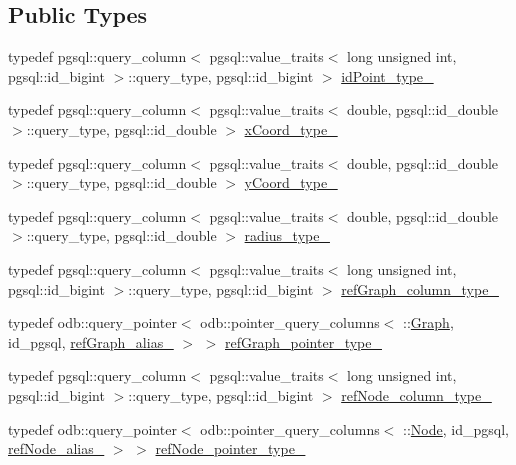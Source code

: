 \subsection*{Public Types}
\begin{DoxyCompactItemize}
\item 
typedef pgsql\+::query\+\_\+column$<$ pgsql\+::value\+\_\+traits$<$ long unsigned int, pgsql\+::id\+\_\+bigint $>$\+::query\+\_\+type, pgsql\+::id\+\_\+bigint $>$ \hyperlink{structodb_1_1query__columns_3_01_1_1_point_00_01id__pgsql_00_01_a_01_4_a1b73c11154d6a12b3bda33b0362e1cbd}{id\+Point\+\_\+type\+\_\+}
\item 
typedef pgsql\+::query\+\_\+column$<$ pgsql\+::value\+\_\+traits$<$ double, pgsql\+::id\+\_\+double $>$\+::query\+\_\+type, pgsql\+::id\+\_\+double $>$ \hyperlink{structodb_1_1query__columns_3_01_1_1_point_00_01id__pgsql_00_01_a_01_4_a2410ebc7698f7395087c9cf262e74e67}{x\+Coord\+\_\+type\+\_\+}
\item 
typedef pgsql\+::query\+\_\+column$<$ pgsql\+::value\+\_\+traits$<$ double, pgsql\+::id\+\_\+double $>$\+::query\+\_\+type, pgsql\+::id\+\_\+double $>$ \hyperlink{structodb_1_1query__columns_3_01_1_1_point_00_01id__pgsql_00_01_a_01_4_a63554286768ef21f26b9034334df7a25}{y\+Coord\+\_\+type\+\_\+}
\item 
typedef pgsql\+::query\+\_\+column$<$ pgsql\+::value\+\_\+traits$<$ double, pgsql\+::id\+\_\+double $>$\+::query\+\_\+type, pgsql\+::id\+\_\+double $>$ \hyperlink{structodb_1_1query__columns_3_01_1_1_point_00_01id__pgsql_00_01_a_01_4_a920c99ed9235ee77ecae8f3de56c88b5}{radius\+\_\+type\+\_\+}
\item 
typedef pgsql\+::query\+\_\+column$<$ pgsql\+::value\+\_\+traits$<$ long unsigned int, pgsql\+::id\+\_\+bigint $>$\+::query\+\_\+type, pgsql\+::id\+\_\+bigint $>$ \hyperlink{structodb_1_1query__columns_3_01_1_1_point_00_01id__pgsql_00_01_a_01_4_a7990da27718c07e8f22372ebf2141b5c}{ref\+Graph\+\_\+column\+\_\+type\+\_\+}
\item 
typedef odb\+::query\+\_\+pointer$<$ odb\+::pointer\+\_\+query\+\_\+columns$<$ \+::\hyperlink{class_graph}{Graph}, id\+\_\+pgsql, \hyperlink{structodb_1_1query__columns__base_3_01_1_1_point_00_01id__pgsql_01_4_a19b02b8f057af3570dba889095b17ccd}{ref\+Graph\+\_\+alias\+\_\+} $>$ $>$ \hyperlink{structodb_1_1query__columns_3_01_1_1_point_00_01id__pgsql_00_01_a_01_4_a46cf54b02d697a2818e886261a4835a7}{ref\+Graph\+\_\+pointer\+\_\+type\+\_\+}
\item 
typedef pgsql\+::query\+\_\+column$<$ pgsql\+::value\+\_\+traits$<$ long unsigned int, pgsql\+::id\+\_\+bigint $>$\+::query\+\_\+type, pgsql\+::id\+\_\+bigint $>$ \hyperlink{structodb_1_1query__columns_3_01_1_1_point_00_01id__pgsql_00_01_a_01_4_a6129668a657849ef92aad6ed6735262c}{ref\+Node\+\_\+column\+\_\+type\+\_\+}
\item 
typedef odb\+::query\+\_\+pointer$<$ odb\+::pointer\+\_\+query\+\_\+columns$<$ \+::\hyperlink{class_node}{Node}, id\+\_\+pgsql, \hyperlink{structodb_1_1query__columns__base_3_01_1_1_point_00_01id__pgsql_01_4_aa47a7e27f3d9c6033aaa352be5a32b02}{ref\+Node\+\_\+alias\+\_\+} $>$ $>$ \hyperlink{structodb_1_1query__columns_3_01_1_1_point_00_01id__pgsql_00_01_a_01_4_a4a11b6d519a7123063c4544cb53fd03f}{ref\+Node\+\_\+pointer\+\_\+type\+\_\+}
\end{DoxyCompactItemize}
